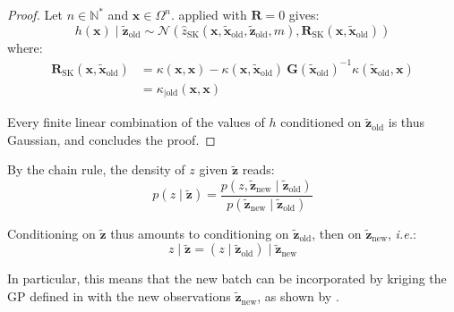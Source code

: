 \begin{proof}
	Let $n\in\mathbb{N}^*$ and $\mathbf{x}\in\Omega^n$.  applied with $\mathbf{R}=0$ gives:
	\begin{equation}
		h(\mathbf{x})\mid\tilde{\mathbf{z}}_{\mathrm{old}}\sim\mathcal{N}\left(\hat{z}_{\mathrm{SK}}(\mathbf{x},\tilde{\mathbf{x}}_{\mathrm{old}},\tilde{\mathbf{z}}_{\mathrm{old}},m),\mathbf{R}_{\mathrm{SK}}(\mathbf{x},\tilde{\mathbf{x}}_{\mathrm{old}})\right)
	\end{equation}
	where:
	\begin{equation}
		\begin{aligned}
		\mathbf{R}_{\mathrm{SK}}(\mathbf{x},\tilde{\mathbf{x}}_{\mathrm{old}})&=\kappa(\mathbf{x},\mathbf{x})-\kappa(\mathbf{x},\tilde{\mathbf{x}}_{\mathrm{old}})\:\mathbf{G}(\tilde{\mathbf{x}}_{\mathrm{old}})^{-1}\kappa(\tilde{\mathbf{x}}_{\mathrm{old}},\mathbf{x})\\
		&=\kappa_{|\mathrm{old}}(\mathbf{x},\mathbf{x})
		\end{aligned}
	\end{equation}

	Every finite linear combination of the values of $h$ conditioned on $\tilde{\mathbf{z}}_{\mathrm{old}}$ is thus Gaussian, and  concludes the proof.
\end{proof}

By the chain rule, the density of $z$ given $\tilde{\mathbf{z}}$ reads:
\begin{equation}
	p(z\mid\tilde{\mathbf{z}})=\frac{p(z,\tilde{\mathbf{z}}_{\mathrm{new}}\mid\tilde{\mathbf{z}}_{\mathrm{old}})}{p(\tilde{\mathbf{z}}_{\mathrm{new}}\mid\tilde{\mathbf{z}}_{\mathrm{old}})}
\end{equation}

Conditioning on $\tilde{\mathbf{z}}$ thus amounts to conditioning on $\tilde{\mathbf{z}}_{\mathrm{old}}$, then on $\tilde{\mathbf{z}}_{\mathrm{new}}$, \textit{i.e.}:
\begin{equation}
	z\mid\tilde{\mathbf{z}}=(z\mid\tilde{\mathbf{z}}_{\mathrm{old}})\mid\tilde{\mathbf{z}}_{\mathrm{new}}
\end{equation}

In particular, this means that the new batch can be incorporated by kriging the GP defined in  with the new observations $\tilde{\mathbf{z}}_{\mathrm{new}}$, as shown by  \cite{bib:kriging-update}.

